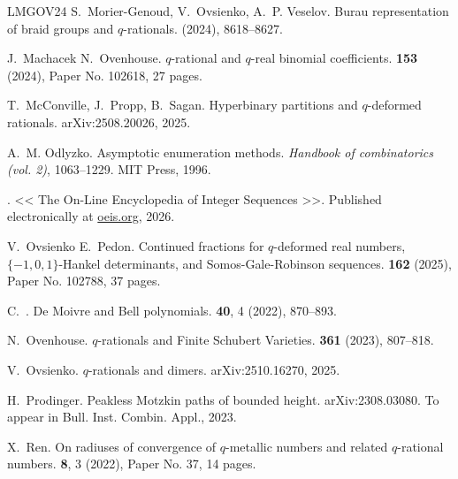 \documentclass[11pt,reqno]{amsart}
\theoremstyle{plain}
\theoremstyle{definition}
\numberwithin{figure}{section}
\numberwithin{table}{section}
\numberwithin{equation}{section}
\begin{document}
\begin{thebibliography}{LMGOV24}
S.~\bgroup\sc Morier-Genoud\egroup{}, V.~\bgroup\sc Ovsienko\egroup{},
  \andname{} A.~P. \bgroup\sc Veselov\egroup{}.
\newblock Burau representation of braid groups and {$q$}-rationals.
  (2024), 8618--8627.

J.~\bgroup\sc Machacek\egroup{} \andname{} N.~\bgroup\sc Ovenhouse\egroup{}.
\newblock $q$-rational and $q$-real binomial coefficients.
 {\bf 153} (2024), Paper No. 102618, 27
  pages.

T.~\bgroup\sc McConville\egroup{}, J.~\bgroup\sc Propp\egroup{}, \andname{}
  B.~\bgroup\sc Sagan\egroup{}.
\newblock Hyperbinary partitions and $q$-deformed rationals.
\newblock arXiv{\string:}2508.20026, 2025.

A.~M. \bgroup\sc Odlyzko\egroup{}.
\newblock Asymptotic enumeration methods.
\newblock \Inname{} {\em Handbook of combinatorics (vol. 2)}, \pagesname{}
  1063--1229. MIT Press, 1996.

\bgroup{}\egroup{}.
\newblock << The On-Line Encyclopedia of Integer Sequences >>.
\newblock Published electronically at \url{oeis.org}, 2026.

V.~\bgroup\sc Ovsienko\egroup{} \andname{} E.~\bgroup\sc Pedon\egroup{}.
\newblock Continued fractions for {$q$}-deformed real numbers,
  {$\{-1,0,1\}$}-{H}ankel determinants, and {S}omos-{G}ale-{R}obinson
  sequences.
 {\bf 162} (2025), Paper No. 102788, 37
  pages.

C.~\bgroup{}\egroup{}.
\newblock De Moivre and Bell polynomials.
 {\bf 40}, 4 (2022), 870--893.

N.~\bgroup\sc Ovenhouse\egroup{}.
\newblock $q$-rationals and Finite {Schubert} Varieties.
 {\bf 361} (2023), 807--818.

V.~\bgroup\sc Ovsienko\egroup{}.
\newblock $q$-rationals and dimers.
\newblock arXiv{\string:}2510.16270, 2025.

H.~\bgroup\sc Prodinger\egroup{}.
\newblock Peakless Motzkin paths of bounded height.
\newblock arXiv{\string :}2308.03080. To appear in Bull. Inst. Combin. Appl.,
  2023.

X.~\bgroup\sc Ren\egroup{}.
\newblock On radiuses of convergence of {$q$}-metallic numbers and related
  {$q$}-rational numbers.
 {\bf 8}, 3 (2022), Paper No. 37, 14 pages.


\end{thebibliography}
\end{document}
